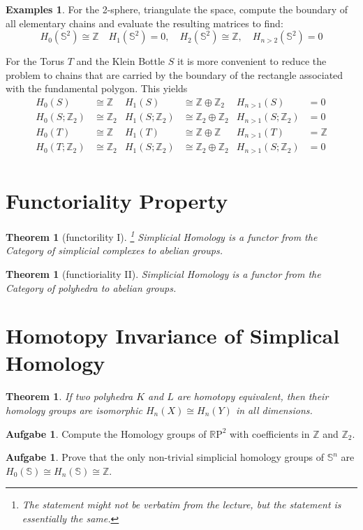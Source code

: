 \documentclass[a4paper,DIV8,10pt]{scrartcl}
\newcommand{\Z}{\ensuremath{\mathbb{Z}}}   %
\newcommand{\R}{\ensuremath{\mathbb{R}}}   %
\newtheorem{theorem}[satz]{Theorem}
\theoremstyle{definition}
\newtheorem{aufgabe}[satz]{Aufgabe}
\newtheorem{examples}[satz]{Examples}
\newtheorem{beispiel}[satz]{Beispiel}
\begin{document}
\begin{examples}
	For the 2-sphere, triangulate the space, compute the boundary of all elementary chains and evaluate the resulting matrices to find:
	\[H_0(\mathbb{S}^2)\cong\Z\quad H_1(\mathbb{S}^2)=0,\quad H_2(\mathbb{S}^2)\cong \Z, \quad H_{n>2}(\mathbb{S}^2)=0\]
	
	For the Torus $T$ and the Klein Bottle $S$ it is more convenient to reduce the problem to chains that are carried by the boundary of the rectangle associated with the fundamental polygon. This yields
	\begin{align*}
	H_0(S)&\cong\Z&H_1(S)&\cong\Z\oplus\Z_2&H_{n>1}(S)&=0\\
	H_0(S;\Z_2)&\cong\Z_2&H_1(S;\Z_2)&\cong\Z_2\oplus\Z_2&H_{n>1}(S;\Z_2)&=0\\
	H_0(T)&\cong\Z&H_1(T)&\cong\Z\oplus\Z&H_{n>1}(T)&=\Z\\
	H_0(T;\Z_2)&\cong\Z_2&H_1(S;\Z_2)&\cong\Z_2\oplus\Z_2&H_{n>1}(S;\Z_2)&=0\\
	\end{align*}
\end{examples}
\section{Functoriality Property}
\begin{theorem}[functorility I]\footnote{The statement might not be verbatim from the lecture, but the statement is essentially the same.}
	Simplicial Homology is a functor from the Category of simplicial complexes to abelian groups.
\end{theorem}

\begin{theorem}[functioriality II]
	Simplicial Homology is a functor from the Category of polyhedra to abelian groups.
\end{theorem}

\section{Homotopy Invariance of Simplical Homology}

\begin{theorem}
	If two polyhedra $K$ and $L$ are homotopy equivalent, then their homology groups are isomorphic $H_n(X)\cong H_n(Y)$ in all dimensions.
\end{theorem}
  \begin{aufgabe}
    Compute the Homology groups of $\R \mathrm{P}^2$ with coefficients in $\Z$ and $\Z_2$.
  \end{aufgabe}
\begin{aufgabe}
	Prove that the only non-trivial simplicial homology groups of $\mathbb{S}^n$ are $H_0(\mathbb{S})\cong H_n(\mathbb{S})\cong \Z$.
\end{aufgabe}
\end{document}
